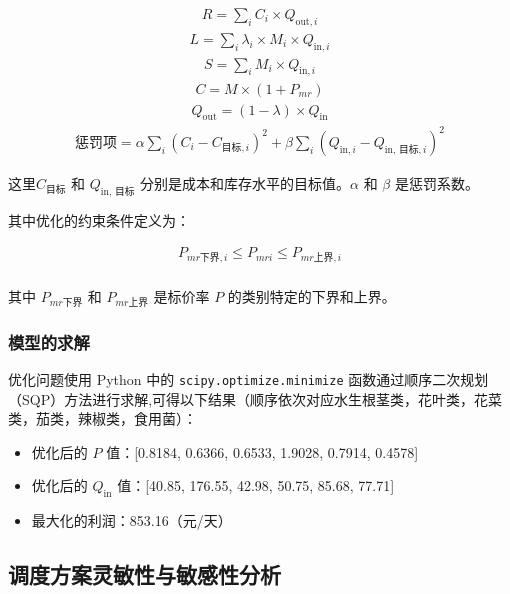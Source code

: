 \documentclass[withoutpreface,bwprint]{cumcmthesis} %
\begin{document}
\begin{align*}
  R = \sum_{i} C_i \times Q_{\text{out},i}   
\end{align*}
\begin{align*}
L = \sum_{i} \lambda_i \times M_i \times Q_{\text{in},i} 
\end{align*}
\begin{align*}
    S = \sum_{i} M_i \times Q_{\text{in},i} 
\end{align*}
\begin{align*}
C = M \times (1 + P_{mr}) 
\end{align*}
\begin{align*}
Q_{\text{out}} = (1 - \lambda) \times Q_{\text{in}} 
\end{align*}
\begin{align*}
\text{惩罚项} = \alpha \sum_{i} (C_i - C_{\text{目标},i})^2 + \beta \sum_{i} (Q_{\text{in},i} - Q_{\text{in, 目标},i})^2
\end{align*}

这里\( C_{\text{目标}} \) 和 \( Q_{\text{in, 目标}} \) 分别是成本和库存水平的目标值。\( \alpha \) 和 \( \beta \) 是惩罚系数。

其中优化的约束条件定义为：

\[
\begin{aligned}
P_{mr\text{下界},i} \leq P_{mri} \leq P_{mr\text{上界},i} \\
\end{aligned}
\]

其中 \( P_{mr\text{下界}} \) 和 \( P_{mr\text{上界}} \) 是标价率 \( P \) 的类别特定的下界和上界。
\subsubsection{模型的求解}
优化问题使用 Python 中的 \texttt{scipy.optimize.minimize} 函数通过顺序二次规划（SQP）方法进行求解,可得以下结果（顺序依次对应水生根茎类，花叶类，花菜类，茄类，辣椒类，食用菌）：
\begin{itemize}
  \item 优化后的 \( P \) 值：[0.8184, 0.6366, 0.6533, 1.9028, 0.7914, 0.4578]
    \item 优化后的 \( Q_{\text{in}} \) 值：[40.85, 176.55, 42.98, 50.75, 85.68, 77.71]
    \item 最大化的利润：853.16（元/天）
\end{itemize}


\subsection{调度方案灵敏性与敏感性分析}
\end{document}
